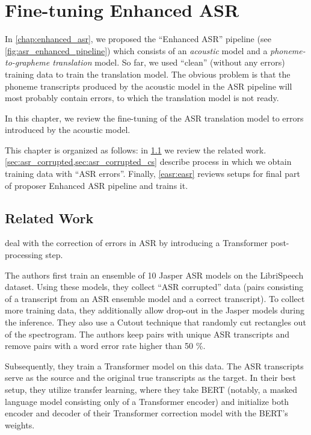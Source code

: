 \chapter{Fine-tuning Enhanced ASR}
\label{chap:fine_tune_enhanced}
In \cref{chap:enhanced_asr}, we proposed the ``Enhanced ASR'' pipeline (see \cref{fig:asr_enhanced_pipeline}) which consists of an \emph{acoustic} model and a \emph{phoneme-to-grapheme translation} model. So far, we used ``clean'' (without any errors) training data to train the translation model. The obvious problem is that the phoneme transcripts produced by the acoustic model in the ASR pipeline will most probably contain errors, to which the translation model is not ready.

In this chapter, we review the fine-tuning of the ASR translation model to errors introduced by the acoustic model.

This chapter is organized as follows: in \cref{feasr:related} we review the related work. \cref{sec:asr_corrupted,sec:asr_corrupted_cs} describe process in which we obtain training data with ``ASR errors''. Finally, \cref{easr:easr} reviews setups for final part of proposer Enhanced ASR pipeline and trains it.

\section{Related Work}
\label{feasr:related}

\citet{hrinchuk2019correction} deal with the correction of errors in ASR by introducing a Transformer post-processing step. 

The authors first train an ensemble of 10 Jasper ASR models on the LibriSpeech dataset. Using these models, they collect ``ASR corrupted'' data (pairs consisting of a transcript from an ASR ensemble model and a correct transcript). To collect more training data, they additionally allow drop-out in the Jasper models during the inference. They also use a Cutout  technique that randomly cut rectangles out of the spectrogram. The authors keep pairs with unique ASR transcripts and remove pairs with a word error rate higher than 50 \%. 

Subsequently, they train a Transformer model on this data. The ASR transcripts serve as the source and the original true transcripts as the target. In their best setup, they utilize transfer learning, where they take BERT \citep{devlin2018bert} (notably, a masked language model consisting only of a Transformer encoder) and initialize both encoder and decoder of their Transformer correction model with the BERT's weights.

